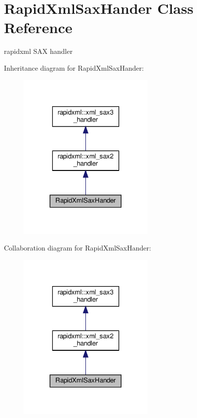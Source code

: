 \hypertarget{classRapidXmlSaxHander}{}\section{Rapid\+Xml\+Sax\+Hander Class Reference}
\label{classRapidXmlSaxHander}


rapidxml S\+AX handler  




Inheritance diagram for Rapid\+Xml\+Sax\+Hander\+:
\nopagebreak
\begin{figure}[H]
\begin{center}
\leavevmode
\includegraphics[width=188pt]{classRapidXmlSaxHander__inherit__graph}
\end{center}
\end{figure}


Collaboration diagram for Rapid\+Xml\+Sax\+Hander\+:
\nopagebreak
\begin{figure}[H]
\begin{center}
\leavevmode
\includegraphics[width=188pt]{classRapidXmlSaxHander__coll__graph}
\end{center}
\end{figure}
